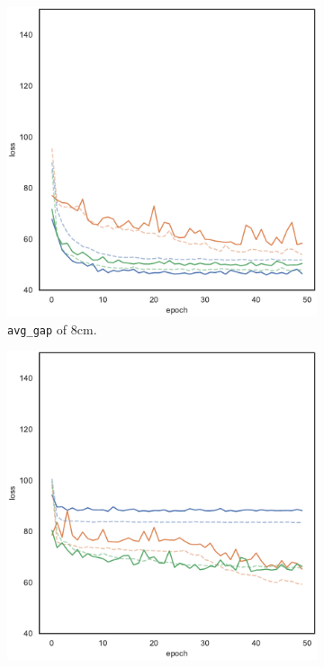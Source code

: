 \begin{figure}[!htb]
	\centering
	\begin{subfigure}[h]{0.3\textwidth}
		\centering
		\includegraphics[width=\textwidth]{contents/images/task1/loss-distributed-gap_8@copy}%
		\caption{\texttt{avg\_gap} of $8$\gls{cm}.}
	\end{subfigure}
	\hfill
	\begin{subfigure}[h]{0.3\textwidth}
		\centering
		\includegraphics[width=\textwidth]{contents/images/task1/loss-distributed-gap_13@copy}%

\end{subfigure}
\end{figure}
